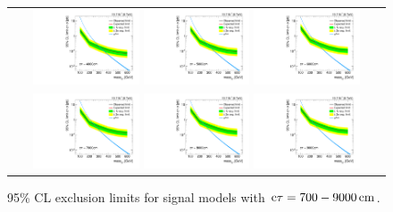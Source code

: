 \begin{figure}[!h]
\begin{tabular}{c}
    \includegraphics[width=0.29\textwidth]{figures/analysis/Interpretation/ExclusionLimits/LimitPlot_ctau4000cm.pdf} 
    \includegraphics[width=0.29\textwidth]{figures/analysis/Interpretation/ExclusionLimits/LimitPlot_ctau5000cm.pdf} 
    \includegraphics[width=0.29\textwidth]{figures/analysis/Interpretation/ExclusionLimits/LimitPlot_ctau6000cm.pdf} \\
    \includegraphics[width=0.29\textwidth]{figures/analysis/Interpretation/ExclusionLimits/LimitPlot_ctau7000cm.pdf} 
    \includegraphics[width=0.29\textwidth]{figures/analysis/Interpretation/ExclusionLimits/LimitPlot_ctau8000cm.pdf} 
    \includegraphics[width=0.29\textwidth]{figures/analysis/Interpretation/ExclusionLimits/LimitPlot_ctau9000cm.pdf} \\
  \end{tabular}
  \caption{95\% CL exclusion limits for signal models with $\text{c}\tau = 700-9000\,\text{cm}$.}
  \label{fig:1dLimitsC}
\end{figure} 
